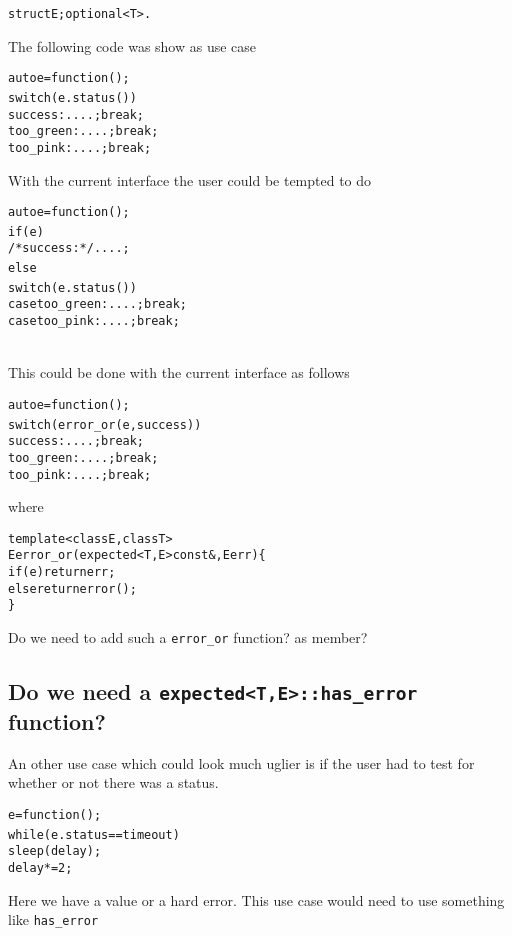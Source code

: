 \documentclass[a4paper,10pt]{article}
\newcommand{\cpp}[1]{\lstinline{#1}}
\begin{document}
\begin{alltt}
struct { E; optional<T> }. 
\end{alltt}

\noindent
The following code was show as use case

\begin{alltt}
auto e = function();
switch (e.status()) {
  success: ....; break;
  too_green: ....; break;
  too_pink: ....; break;
} 
\end{alltt}

\noindent
With the current interface the user could be tempted to do

\begin{alltt}
auto e = function();
if (e) {
  /*success:*/ ....;
} else {
  switch (e.status()) {
  case too_green: ....; break;
  case too_pink: ....; break;
  }
} 
\end{alltt}

\noindent
This could be done with the current interface as follows

\begin{alltt}
auto e = function();
switch (error_or(e, success)) {
  success: ....; break;
  too_green: ....; break;
  too_pink: ....; break;
} 
\end{alltt}

\noindent
where

\begin{alltt}
template <class E, class T>
E error_or(expected<T,E> const&, E err) \{
  if(e) return err;
  else return error();
\}
\end{alltt}

\noindent
Do we need to add such a \cpp{error_or} function? as member? 

\subsection{Do we need a  \cpp{expected<T,E>::has_error}  function?}

An other use case which could look much uglier is if the user had to test for whether or not there was a status.

\begin{alltt}
  e = function();
  while ( e.status == timeout ) {
    sleep(delay);
    delay *=2;
  }
\end{alltt}

\noindent
Here we have a value or a hard error.  
This use case would need to use something like \cpp{has_error}
\end{document}
